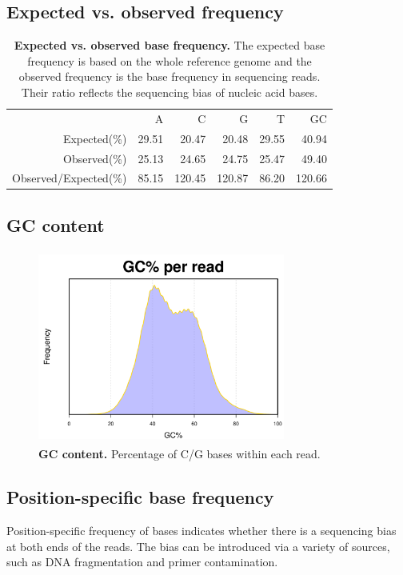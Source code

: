 \documentclass{article}
\begin{document}
\subsection{Expected vs. observed frequency}
\begin{table}
\begin{tabular}{|r|r|r|r|r|r|}
  \hline
 & A & C & G & T & GC \\ 
  \rowcolor[gray]{0.9} \hline
Expected(\%) & 29.51 &  20.47 &  20.48 & 29.55 &  40.94 \\ 
  Observed(\%) & 25.13 &  24.65 &  24.75 & 25.47 &  49.40 \\ 
   \rowcolor[gray]{0.9}Observed/Expected(\%) & 85.15 & 120.45 & 120.87 & 86.20 & 120.66 \\ 
   \hline
\end{tabular}\caption{\textbf{Expected vs. observed base frequency.} The expected base frequency is based on the whole reference genome and the observed frequency is the base frequency in sequencing reads. Their ratio reflects the sequencing bias of nucleic acid bases.}
\end{table}

\subsection{GC content}
\begin{center}
\begin{figure}
\includegraphics[width=3.2in, height=2.5in]{bamchop-base-gc}
\caption{\textbf{GC content.} Percentage of C/G bases within each read.}
\end{figure}
\end{center}

\subsection{Position-specific base frequency}
Position-specific frequency of bases indicates whether there is a sequencing bias at both ends of the reads. The bias can be introduced via a variety of sources, such as DNA fragmentation and primer contamination. 
\end{document}
